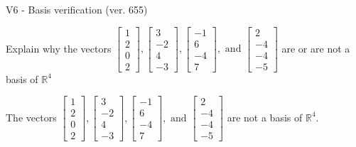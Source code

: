 \begin{exercise}
  \begin{exerciseTitle}V6 - Basis verification (ver. 655)\end{exerciseTitle}
  \begin{exerciseStatement}
    Explain why the vectors \(\left[\begin{array}{r}
1 \\
2 \\
0 \\
2
\end{array}\right] , \left[\begin{array}{r}
3 \\
-2 \\
4 \\
-3
\end{array}\right] , \left[\begin{array}{r}
-1 \\
6 \\
-4 \\
7
\end{array}\right] , \text{ and } \left[\begin{array}{r}
2 \\
-4 \\
-4 \\
-5
\end{array}\right]\) are or are not a basis of \(\mathbb{R}^4\)	


  \end{exerciseStatement}
  \begin{exerciseAnswer}
   The vectors \(\left[\begin{array}{r}
1 \\
2 \\
0 \\
2
\end{array}\right] , \left[\begin{array}{r}
3 \\
-2 \\
4 \\
-3
\end{array}\right] , \left[\begin{array}{r}
-1 \\
6 \\
-4 \\
7
\end{array}\right] , \text{ and } \left[\begin{array}{r}
2 \\
-4 \\
-4 \\
-5
\end{array}\right]\) 
  	 are not  a basis of \(\mathbb{R}^4\).
  


  \end{exerciseAnswer}
\end{exercise}